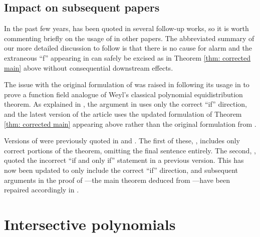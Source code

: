 \documentclass[11pt]{amsart}
\theoremstyle{theorem}
\theoremstyle{definition}
\begin{document}

\subsection{Impact on subsequent papers}

In the past few years, \cite[Theorem 0.3]{bl} has been quoted in several follow-up works, so it is worth commenting briefly on the usage of \cite[Theorem 0.3]{bl} in other papers.
The abbreviated summary of our more detailed discussion to follow is that there is no cause for alarm and the extraneous ``f'' appearing in \cite{bl} can safely be excised as in Theorem \ref{thm: corrected main} above without consequential downstream effects.

The issue with the original formulation of \cite[Theorem 0.3]{bl} was raised in \cite{cgllw} following its usage in \cite{a} to prove a function field analogue of Weyl's classical polynomial equidistribution theorem.
As explained in \cite[Remark 2.2]{a}, the argument in \cite{a} uses only the correct ``if'' direction, and the latest version of the article uses the updated formulation of Theorem \ref{thm: corrected main} appearing above rather than the original formulation from \cite{bl}.

Versions of \cite[Theorem 0.3]{bl} were previously quoted in \cite[Theorem 1.7]{ab_low_characteristic} and \cite[Theorem 5.2]{ab_fields}.
The first of these, \cite[Theorem 1.7]{ab_low_characteristic}, includes only correct portions of the theorem, omitting the final sentence entirely.
The second, \cite[Theorem 5.2]{ab_fields}, quoted the incorrect ``if and only if'' statement in a previous version.
This has now been updated to only include the correct ``if'' direction, and subsequent arguments in the proof of \cite[Theorem 1.5]{ab_fields}---the main theorem deduced from \cite[Theorem 0.3]{bl}---have been repaired accordingly in \cite[Section 5]{ab_fields}.


\section{Intersective polynomials} \label{sec: intersective}
\end{document}
